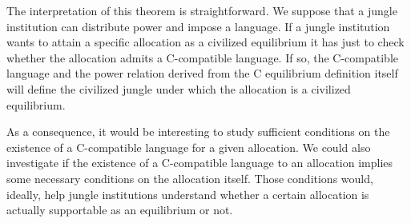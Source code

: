 The interpretation of this theorem is straightforward. We suppose that a jungle institution can distribute power and impose a language. If a jungle institution wants to attain a specific allocation as a civilized equilibrium it has just to check whether the allocation admits a C-compatible language. If so, the C-compatible language and the power relation derived from the C equilibrium definition itself will define the civilized jungle under which the allocation is a civilized equilibrium. 

\vspace{3mm}

As a consequence, it would be interesting to study sufficient conditions on the existence of a C-compatible language for a given allocation. We could also investigate if the existence of a C-compatible language to an allocation implies some necessary conditions on the allocation itself. Those conditions would, ideally, help jungle institutions understand whether a certain allocation is actually supportable as an equilibrium or not.



\newpage







